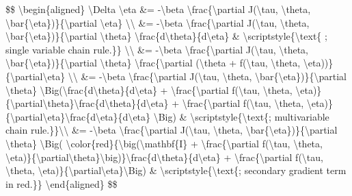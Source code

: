 \$\$ \textbackslash begin\{aligned\} \textbackslash Delta \textbackslash eta \&= -\textbackslash beta \textbackslash frac\{\textbackslash partial J(\textbackslash tau\textquotesingle, \textbackslash theta\textquotesingle, \textbackslash bar\{\textbackslash eta\})\}\{\textbackslash partial \textbackslash eta\} \textbackslash\textbackslash{} \&= -\textbackslash beta \textbackslash frac\{\textbackslash partial J(\textbackslash tau\textquotesingle, \textbackslash theta\textquotesingle, \textbackslash bar\{\textbackslash eta\})\}\{\textbackslash partial \textbackslash theta\textquotesingle\} \textbackslash frac\{d\textbackslash theta\textquotesingle\}\{d\textbackslash eta\} \& \textbackslash scriptstyle\{\textbackslash text\{ ; single variable chain rule.\}\} \textbackslash\textbackslash{} \&= -\textbackslash beta \textbackslash frac\{\textbackslash partial J(\textbackslash tau\textquotesingle, \textbackslash theta\textquotesingle, \textbackslash bar\{\textbackslash eta\})\}\{\textbackslash partial \textbackslash theta\textquotesingle\} \textbackslash frac\{\textbackslash partial (\textbackslash theta + f(\textbackslash tau, \textbackslash theta, \textbackslash eta))\}\{\textbackslash partial\textbackslash eta\} \textbackslash\textbackslash{} \&= -\textbackslash beta \textbackslash frac\{\textbackslash partial J(\textbackslash tau\textquotesingle, \textbackslash theta\textquotesingle, \textbackslash bar\{\textbackslash eta\})\}\{\textbackslash partial \textbackslash theta\textquotesingle\} \textbackslash Big(\textbackslash frac\{d\textbackslash theta\}\{d\textbackslash eta\} + \textbackslash frac\{\textbackslash partial f(\textbackslash tau, \textbackslash theta, \textbackslash eta)\}\{\textbackslash partial\textbackslash theta\}\textbackslash frac\{d\textbackslash theta\}\{d\textbackslash eta\} + \textbackslash frac\{\textbackslash partial f(\textbackslash tau, \textbackslash theta, \textbackslash eta)\}\{\textbackslash partial\textbackslash eta\}\textbackslash frac\{d\textbackslash eta\}\{d\textbackslash eta\} \textbackslash Big) \& \textbackslash scriptstyle\{\textbackslash text\{; multivariable chain rule.\}\}\textbackslash\textbackslash{} \&= -\textbackslash beta \textbackslash frac\{\textbackslash partial J(\textbackslash tau\textquotesingle, \textbackslash theta\textquotesingle, \textbackslash bar\{\textbackslash eta\})\}\{\textbackslash partial \textbackslash theta\textquotesingle\} \textbackslash Big( \textbackslash color\{red\}\{\textbackslash big(\textbackslash mathbf\{I\} + \textbackslash frac\{\textbackslash partial f(\textbackslash tau, \textbackslash theta, \textbackslash eta)\}\{\textbackslash partial\textbackslash theta\}\textbackslash big)\}\textbackslash frac\{d\textbackslash theta\}\{d\textbackslash eta\} + \textbackslash frac\{\textbackslash partial f(\textbackslash tau, \textbackslash theta, \textbackslash eta)\}\{\textbackslash partial\textbackslash eta\}\textbackslash Big) \& \textbackslash scriptstyle\{\textbackslash text\{; secondary gradient term in red.\}\} \textbackslash end\{aligned\} \$\$

